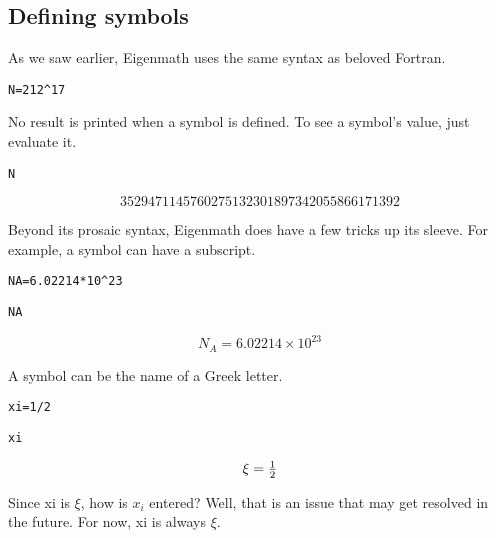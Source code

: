 
\subsection{Defining symbols}
As we saw earlier, Eigenmath uses the same syntax as beloved Fortran.

\medskip
\verb$N=212^17$

\medskip
\noindent
No result is printed when a symbol is defined.
To see a symbol's value, just evaluate it.

\medskip
\verb$N$

$$3529471145760275132301897342055866171392$$

\medskip
\noindent
Beyond its prosaic syntax, Eigenmath does have a few tricks up its sleeve.
For example, a symbol can have a subscript.

\medskip
\verb$NA=6.02214*10^23$

\verb$NA$

$$N_A=6.02214\times10^{23}$$

\medskip
\noindent
A symbol can be the name of a Greek letter.

\medskip
\verb$xi=1/2$

\verb$xi$

$$\xi=\hbox{$1\over2$}$$

\medskip
\noindent
Since xi is $\xi$, how is $x_i$ entered?
Well, that is an issue that may get resolved in the future.
For now, xi is always $\xi$.

\medskip
\noindent


